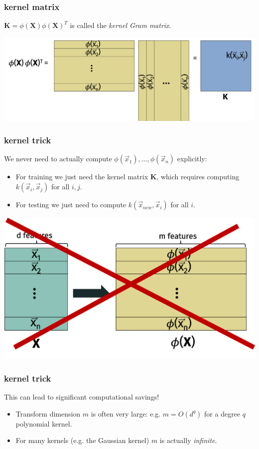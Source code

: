 \documentclass[handout,compress]{beamer}
\newcommand{\bv}[1]{\mathbf{#1}}
\begin{document}
\begin{frame} 
	\frametitle{kernel matrix}
	\begin{center}
	$\bv{K} = \phi(\bv{X})\phi(\bv{X})^T$ is called the \emph{kernel Gram matrix}.
	
	\includegraphics[width=\textwidth]{kernel_matrix.png}
	\end{center}
\end{frame}

\begin{frame} 
	\frametitle{kernel trick}
	We never need to actually compute $\phi(\vec{x}_1), \ldots, \phi(\vec{x}_n)$ explicitly: 
	\begin{itemize}
		\item For training we just need the kernel matrix $\bv{K}$, which requires computing $k(\vec{x}_i,\vec{x}_j)$ for all $i,j$. 
		\item For testing we just need to compute $k(\vec{x}_{new},\vec{x}_i)$ for all $i$. 
	\end{itemize}
\begin{center}
	\includegraphics[width=.8\textwidth]{kernel_adv.png}
\end{center}
\end{frame}

\begin{frame} 
	\frametitle{kernel trick}
	This can lead to significant computational savings!
	\begin{itemize}
		\item Transform dimension $m$ is often very large: e.g. $m = O(d^q)$ for a degree $q$ polynomial kernel. 
		\item For many kernels (e.g. the Gaussian kernel) $m$ is actually \textit{infinite}. 
	\end{itemize}
\end{frame}
\end{document}
